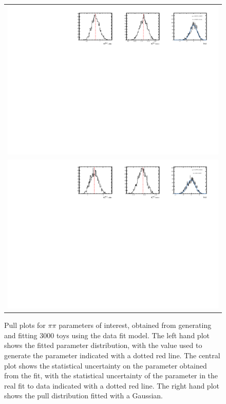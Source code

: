 \begin{figure}
\begin{tabular}{c}
\includegraphics[width=\textwidth]{ANA_resources/Plots/Data_fit/FitterBias//split//R_Bs_pipi_run1.pdf} \\
\includegraphics[width=\textwidth]{ANA_resources/Plots/Data_fit/FitterBias//split//R_Bs_pipi_run2.pdf} \\
  \end{tabular}
  \caption{Pull plots for $\pi\pi$ parameters of interest, obtained from generating and fitting 3000 toys using the data fit model. The left hand plot shows the fitted parameter distribution, with the value used to generate the parameter indicated with a dotted red line. The central plot shows the statistical uncertainty on the parameter obtained from the fit, with the statistical uncertainty of the parameter in the real fit to data indicated with a dotted red line. The right hand plot shows the pull distribution fitted with a Gaussian.}
\label{fig:pipi/split/_pulls}
\end{figure}
